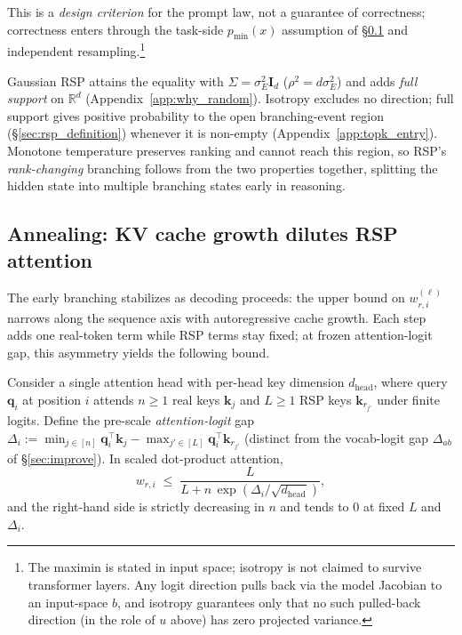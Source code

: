 This is a \emph{design criterion} for the prompt law, not a guarantee of correctness; correctness enters through the task-side $p_{\min}(x)$ assumption of \S\ref{sec:converge} and independent resampling.\footnote{The maximin is stated in input space; isotropy is not claimed to survive transformer layers. Any logit direction pulls back via the model Jacobian to an input-space $b$, and isotropy guarantees only that no such pulled-back direction (in the role of $u$ above) has zero projected variance.}

Gaussian RSP attains the equality with $\Sigma = \sigma_E^2 \mathbf{I}_d$ ($\rho^2 = d\sigma_E^2$) and adds \emph{full support} on $\mathbb{R}^d$ (Appendix~\ref{app:why_random}). Isotropy excludes no direction; full support gives positive probability to the open branching-event region (\S\ref{sec:rsp_definition}) whenever it is non-empty (Appendix~\ref{app:topk_entry}). Monotone temperature preserves ranking and cannot reach this region, so RSP's \emph{rank-changing} branching follows from the two properties together, splitting the hidden state into multiple branching states early in reasoning.

\subsection{Annealing: KV cache growth dilutes RSP attention}\label{sec:converge}

The early branching stabilizes as decoding proceeds: the upper bound on $w_{r,i}^{(\ell)}$ narrows along the sequence axis with autoregressive cache growth. Each step adds one real-token term while RSP terms stay fixed; at frozen attention-logit gap, this asymmetry yields the following bound.

\begin{theorem}\label{thm:decay}
Consider a single attention head with per-head key dimension $d_{\text{head}}$, where query $\mathbf{q}_i$ at position $i$ attends $n\ge1$ real keys $\mathbf{k}_j$ and $L\ge1$ RSP keys $\mathbf{k}_{r_{j'}}$ under finite logits. Define the pre-scale \emph{attention-logit} gap $\Delta_i := \min_{j\in[n]}\mathbf{q}_i^\top\mathbf{k}_j - \max_{j'\in[L]}\mathbf{q}_i^\top\mathbf{k}_{r_{j'}}$ (distinct from the vocab-logit gap $\Delta_{ab}$ of \S\ref{sec:improve}). In scaled dot-product attention,
\[
w_{r,i} \;\le\; \frac{L}{L + n\,\exp(\Delta_i/\sqrt{d_{\text{head}}})},
\]
and the right-hand side is strictly decreasing in $n$ and tends to $0$ at fixed $L$ and $\Delta_i$.
\end{theorem}

